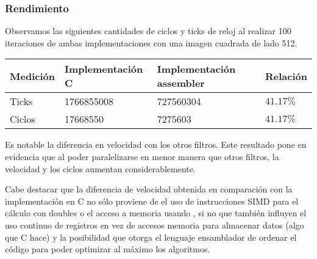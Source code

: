 \subsubsection{Rendimiento}

Observamos las siguientes cantidades de ciclos y ticks de reloj al realizar 100 iteraciones de ambas implementaciones con una imagen cuadrada de lado 512.
\begin{center}
    \begin{tabular}{|l|l|l|l|}
        \hline
        Medición & Implementación C & Implementación assembler & Relación \\
        \hline
        Ticks    & 1766855008      & 727560304               & $41.17\%$ \\
        Ciclos   & 17668550       & 7275603                & $41.17\%$ \\
        \hline
    \end{tabular}
\end{center}

Es notable la diferencia en velocidad con los otros filtros. Este resultado pone en evidencia que al poder paralelizarse en menor manera que otros filtros, la velocidad y los ciclos aumentan considerablemente.

Cabe destacar que la diferencia de velocidad obtenida en comparación con la implementación en C no sólo proviene de el uso de instrucciones SIMD para el cálculo con doubles o el acceso a memoria usando , si no que también influyen el uso continuo de registros en vez de accesos memoria para almacenar datos (algo que C hace) y la posibilidad que otorga el lenguaje ensamblador de ordenar el código para poder optimizar al máximo los algoritmos.